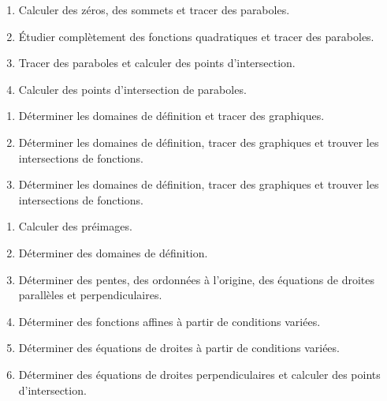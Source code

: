 \documentclass[a4paper,12pt]{report}
\begin{document}
{
\begin{enumerate}[label=\arabic*),resume]
    \item Calculer des zéros, des sommets et tracer des paraboles.
    \item Étudier complètement des fonctions quadratiques et tracer des paraboles.
    \item Tracer des paraboles et calculer des points d'intersection.
    \item Calculer des points d'intersection de paraboles.
\end{enumerate}

\begin{enumerate}[label=\arabic*),resume]
    \item Déterminer les domaines de définition et tracer des graphiques.
    \item Déterminer les domaines de définition, tracer des graphiques et trouver les intersections de fonctions.
    \item Déterminer les domaines de définition, tracer des graphiques et trouver les intersections de fonctions.

\end{enumerate}

\begin{enumerate}[label=\arabic*),resume]
    \item Calculer des préimages.
    \item Déterminer des domaines de définition.
    \item Déterminer des pentes, des ordonnées à l'origine, des équations de droites parallèles et perpendiculaires.
    \item Déterminer des fonctions affines à partir de conditions variées.
    \item Déterminer des équations de droites à partir de conditions variées.
    \item Déterminer des équations de droites perpendiculaires et calculer des points d'intersection.
\end{enumerate}
}
\end{document}
